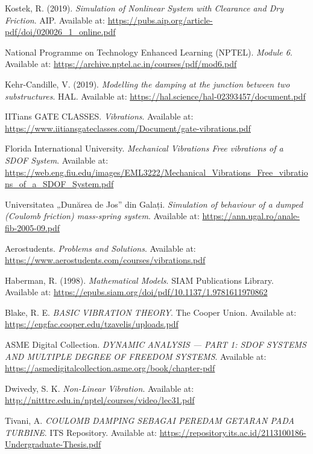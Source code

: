\documentclass[12pt, a4paper, oneside]{report}
\begin{document}
\begin{thebibliography}{99}
	Kostek, R. (2019). \textit{Simulation of Nonlinear System with Clearance and Dry Friction}. AIP. Available at: \url{https://pubs.aip.org/article-pdf/doi/020026_1_online.pdf}

	National Programme on Technology Enhanced Learning (NPTEL). \textit{Module 6}. Available at: \url{https://archive.nptel.ac.in/courses/pdf/mod6.pdf}

	Kehr-Candille, V. (2019). \textit{Modelling the damping at the junction between two substructures}. HAL. Available at: \url{https://hal.science/hal-02393457/document.pdf}

	IITians GATE CLASSES. \textit{Vibrations}. Available at: \url{https://www.iitiansgateclasses.com/Document/gate-vibrations.pdf}

	Florida International University. \textit{Mechanical Vibrations Free vibrations of a SDOF System}. Available at: \url{https://web.eng.fiu.edu/images/EML3222/Mechanical_Vibrations_Free_vibrations_of_a_SDOF_System.pdf}

	Universitatea „Dunărea de Jos” din Galați. \textit{Simulation of behaviour of a dumped (Coulomb friction) mass-spring system}. Available at: \url{https://ann.ugal.ro/anale-fib-2005-09.pdf}

	Aerostudents. \textit{Problems and Solutions}. Available at: \url{https://www.aerostudents.com/courses/vibrations.pdf}

	Haberman, R. (1998). \textit{Mathematical Models}. SIAM Publications Library. Available at: \url{https://epubs.siam.org/doi/pdf/10.1137/1.9781611970862}

	Blake, R. E. \textit{BASIC VIBRATION THEORY}. The Cooper Union. Available at: \url{https://engfac.cooper.edu/tzavelis/uploads.pdf}

	ASME Digital Collection. \textit{DYNAMIC ANALYSIS — PART 1: SDOF SYSTEMS AND MULTIPLE DEGREE OF FREEDOM SYSTEMS}. Available at: \url{https://asmedigitalcollection.asme.org/book/chapter-pdf}

	Dwivedy, S. K. \textit{Non-Linear Vibration}. Available at: \url{http://nitttrc.edu.in/nptel/courses/video/lec31.pdf}

	Tivani, A. \textit{COULOMB DAMPING SEBAGAI PEREDAM GETARAN PADA TURBINE}. ITS Repository. Available at: \url{https://repository.its.ac.id/2113100186-Undergraduate-Thesis.pdf}


\end{thebibliography}
\end{document}
